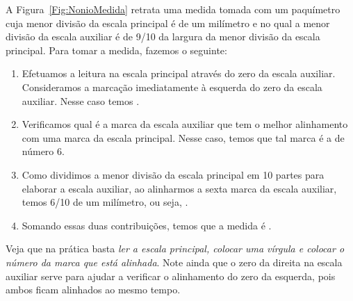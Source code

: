 A Figura~\ref{Fig:NonioMedida} retrata uma medida tomada com um paquímetro cuja menor divisão da escala principal é de um milímetro e no qual a menor divisão da escala auxiliar é de 9/10 da largura da menor divisão da escala principal. Para tomar a medida, fazemos o seguinte:
%
\begin{marginfigure}
\centering
{}
\caption{\label{Fig:NonioMedida}}
\end{marginfigure}
%
\begin{enumerate}
	\item Efetuamos a leitura na escala principal através do zero da escala auxiliar. Consideramos a marcação imediatamente à esquerda do zero da escala auxiliar. Nesse caso temos .
	\item Verificamos qual é a marca da escala auxiliar que tem o melhor alinhamento com uma marca da escala principal. Nesse caso, temos que tal marca é a de número 6.
	\item Como dividimos a menor divisão da escala principal em 10 partes para elaborar a escala auxiliar, ao alinharmos a sexta marca da escala auxiliar, temos 6/10 de um milímetro, ou seja, .
	\item Somando essas duas contribuições, temos que a medida é .
\end{enumerate}
%
Veja que na prática basta \emph{ler a escala principal, colocar uma vírgula e colocar o número da marca que está alinhada}. Note ainda que o zero da direita na escala auxiliar serve para ajudar a verificar o alinhamento do zero da esquerda, pois ambos ficam alinhados ao mesmo tempo.

